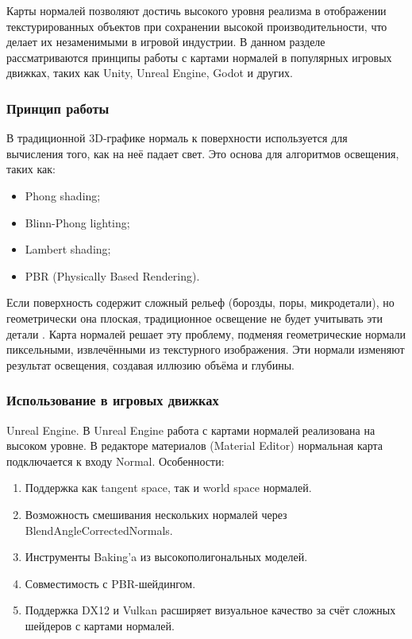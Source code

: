 Карты нормалей позволяют достичь высокого уровня реализма в отображении текстурированных объектов при сохранении высокой производительности, что делает их незаменимыми в игровой индустрии. В данном разделе рассматриваются принципы работы с картами нормалей в популярных игровых движках, таких как Unity, Unreal Engine, Godot и других.
\subsubsection{Принцип работы}

В традиционной 3D-графике нормаль к поверхности используется для вычисления того, как на неё падает свет. Это основа для алгоритмов освещения, таких как:
\begin{itemize}
	\item Phong shading;
	\item Blinn-Phong lighting;
	\item Lambert shading;
	\item PBR (Physically Based Rendering).
\end{itemize}

Если поверхность содержит сложный рельеф (борозды, поры, микродетали), но геометрически она плоская, традиционное освещение не будет учитывать эти детали \cite{bruno2024}. Карта нормалей решает эту проблему, подменяя геометрические нормали пиксельными, извлечёнными из текстурного изображения. Эти нормали изменяют результат освещения, создавая иллюзию объёма и глубины.
\subsubsection{Использование в игровых движках}

Unreal Engine. В Unreal Engine работа с картами нормалей реализована на высоком уровне. В редакторе материалов (Material Editor) нормальная карта подключается к входу Normal. Особенности:
\begin{enumerate}
	\item Поддержка как tangent space, так и world space нормалей.
	\item Возможность смешивания нескольких нормалей через BlendAngleCorrectedNormals.
	\item Инструменты Baking'a из высокополигональных моделей.
	\item Совместимость с PBR-шейдингом.
	\item Поддержка DX12 и Vulkan расширяет визуальное качество за счёт сложных шейдеров с картами нормалей.
\end{enumerate}
